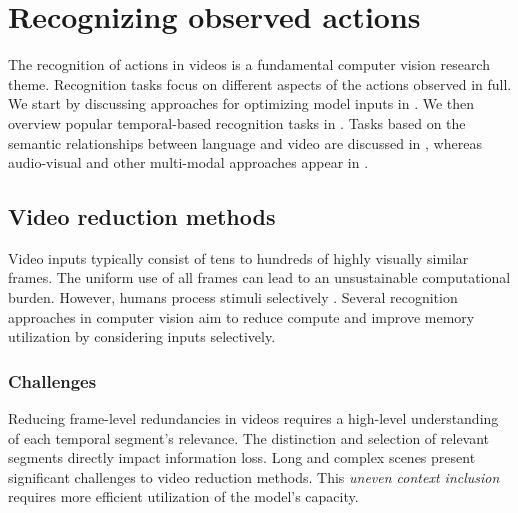 \section{Recognizing observed actions}
\label{sec:recognition}

The recognition of actions in videos is a fundamental computer vision research theme. Recognition tasks focus on different aspects of the actions observed in full. We start by discussing approaches for optimizing model inputs in . We then overview popular temporal-based recognition tasks in . Tasks based on the semantic relationships between language and video are discussed in , whereas audio-visual and other multi-modal approaches appear in . %


\subsection{Video reduction methods}
\label{sec:recognition::inputs}


Video inputs typically consist of tens to hundreds of highly visually similar frames. The uniform use of all frames can lead to an unsustainable computational burden. However, humans process stimuli selectively \citep{eagleman2010does}. 
Several recognition approaches in computer vision aim to reduce compute and improve memory utilization by considering inputs selectively.


\subsubsection{Challenges}
 

Reducing frame-level redundancies in videos requires a high-level understanding of each temporal segment's relevance. The distinction and selection of relevant segments directly impact information loss. Long and complex scenes present significant challenges to video reduction methods. This \textit{uneven context inclusion} requires more efficient utilization of the model's capacity.

